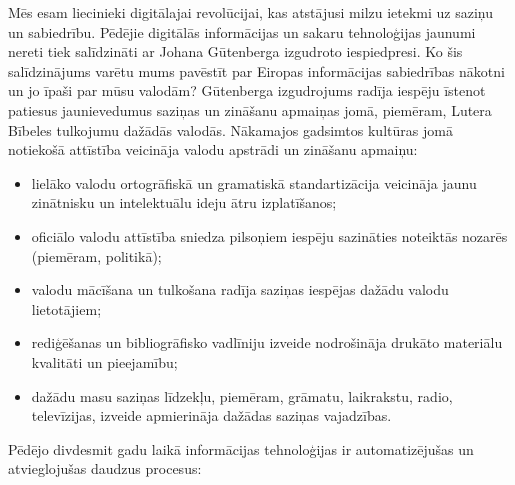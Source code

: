 \clearpage



\begin{multicols}{2}

Mēs esam liecinieki digitālajai revolūcijai, kas atstājusi milzu ietekmi uz saziņu un sabiedrību. 
Pēdējie digitālās informācijas un sakaru tehnoloģijas jaunumi nereti tiek salīdzināti ar Johana Gūtenberga izgudroto iespiedpresi. 
Ko šis salīdzinājums varētu mums pavēstīt par Eiropas informācijas sabiedrības nākotni un jo īpaši par mūsu valodām?
Gūtenberga izgudrojums radīja iespēju īstenot patiesus jaunievedumus saziņas un zināšanu apmaiņas jomā, piemēram, Lutera Bībeles tulkojumu dažādās valodās. 
Nākamajos gadsimtos kultūras jomā notiekošā attīstība veicināja valodu apstrādi un zināšanu apmaiņu:

\begin{itemize}
\item  lielāko valodu ortogrāfiskā un gramatiskā standartizācija veicināja jaunu zinātnisku un intelektuālu ideju ātru izplatīšanos;
\item  oficiālo valodu attīstība sniedza pilsoņiem iespēju sazināties noteiktās nozarēs (piemēram, politikā);
\item  valodu mācīšana un tulkošana radīja saziņas iespējas dažādu valodu lietotājiem;
\item  rediģēšanas un bibliogrāfisko vadlīniju izveide nodrošināja drukāto materiālu kvalitāti un pieejamību;
\item  dažādu masu saziņas līdzekļu, piemēram, grāmatu, laikrakstu, radio, televīzijas, izveide apmierināja dažādas saziņas vajadzības.  
\end{itemize}

Pēdējo divdesmit gadu laikā informācijas tehnoloģijas ir automatizējušas un atvieglojušas daudzus procesus:


\end{multicols}
